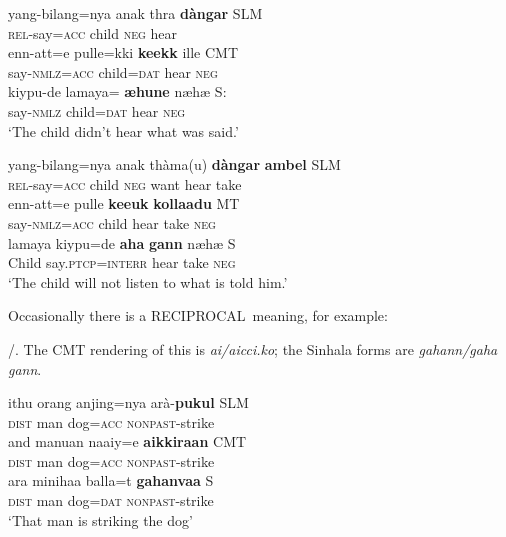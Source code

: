\ea
\ea\label{jaffar:ex:11}
\gll yang-bilang=nya anak thra \textbf{dàngar}  SLM\\
 \textsc{rel}-say=\textsc{acc}  child \textsc{neg} hear\\ 
\ex%
\gll  {\textesh}enn-att=e pulle=kki \textbf{keekk{\E}} ille CMT\\
 say-\textsc{nmlz}=\textsc{acc}  child=\textsc{dat}  hear \textsc{neg}\\
\ex%
\gll kiy{\E}pu-de lamaya={\textrtailt}{\E} \textbf{{\ae}hune} n{\ae}h{\ae} S: \\
 say-\textsc{nmlz} child=\textsc{dat}  hear \textsc{neg} \\
 `The child didn't hear what was said.'
\z
\z

\ea
\ea\label{jaffar:ex:14}
\gll yang-bilang=nya anak thàma(u) \textbf{dàngar} \textbf{ambel} SLM \\
 \textsc{rel}-say=\textsc{acc}  child \textsc{neg} want hear take\\
\ex%
\gll {\textesh}enn-att=e pulle \textbf{kee{\textrtailt}{\textrtailt}uk} \textbf{kollaadu}  MT \\
 say-\textsc{nmlz}=\textsc{acc}  child  hear take \textsc{neg}\\
\ex%
\gll lamaya kiy{\E}pu=de \textbf{aha} \textbf{gann{\E}} n{\ae}h{\ae}  S \\
 Child say.\textsc{ptcp}=\textsc{interr} hear take \textsc{neg}\\
`The child will not listen to what is told him.'
\z
\z

Occasionally there is a RECIPROCAL~meaning, for example:

/. The CMT rendering of this is \textit{a{\dz}i/a{\dz}icci.ko}; the Sinhala forms are \textit{gahann{\E}/gaha gann{\E}}.

\ea
\ea\label{jaffar:ex:17}
\gll ithu orang anjing=nya arà-\textbf{pukul}  SLM \\
 \textsc{dist} man dog=\textsc{acc}  \textsc{nonpast}-strike\\
\ex%
\gll and{\E} manu{\textesh}an naaiy=e \textbf{a{\dz}ikkiraan} CMT \\
 \textsc{dist} man dog=\textsc{acc}  \textsc{nonpast}-strike\\
\ex%
\gll ara minihaa balla=t{\E} \textbf{gahan{\E}vaa}  S \\
 \textsc{dist} man dog=\textsc{dat}  \textsc{nonpast}-strike\\
`That man is striking the dog'
\z
\z

